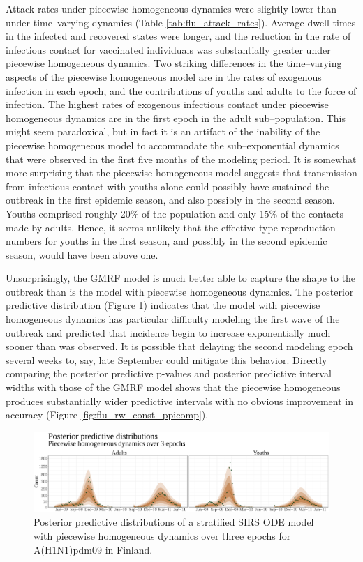 Attack rates under piecewise homogeneous dynamics were slightly lower than under time--varying dynamics (Table \ref{tab:flu_attack_rates}). Average dwell times in the infected and recovered states were longer, and the reduction in the rate of infectious contact for vaccinated individuals was substantially greater under piecewise homogeneous dynamics. Two striking differences in the time--varying aspects of the piecewise homogeneous model are in the rates of exogenous infection in each epoch, and the contributions of youths and adults to the force of infection. The highest rates of exogenous infectious contact under piecewise homogeneous dynamics are in the first epoch in the adult sub--population. This might seem paradoxical, but in fact it is an artifact of the inability of the piecewise homogeneous model to accommodate the sub--exponential dynamics that were observed in the first five months of the modeling period. It is somewhat more surprising that the piecewise homogeneous model suggests that transmission from infectious contact with youths alone could possibly have sustained the outbreak in the first epidemic season, and also possibly in the second season. Youths comprised roughly 20\% of the population and only 15\% of the contacts made by adults. Hence, it seems unlikely that the effective type reproduction numbers for youths in the first season, and possibly in the second epidemic season, would have been above one. 

Unsurprisingly, the GMRF model is much better able to capture the shape to the outbreak than is the model with piecewise homogeneous dynamics. The posterior predictive distribution (Figure \ref{fig:flupostpredsconstode}) indicates that the model with piecewise homogeneous dynamics has particular difficulty modeling the first wave of the outbreak and predicted that incidence begin to increase exponentially much sooner than was observed. It is possible that delaying the second modeling epoch several weeks to, say, late September could mitigate this behavior. Directly comparing the posterior predictive p-values and posterior predictive interval widths with those of the GMRF model shows that the piecewise homogeneous produces substantially wider predictive intervals with no obvious improvement in accuracy (Figure \ref{fig:flu_rw_const_ppicomp}).

\begin{figure}[htbp]
	\centering
	\includegraphics[width=\linewidth]{figures/flu_postpreds_const_ode}
	\caption{Posterior predictive distributions of a stratified SIRS ODE model with piecewise homogeneous dynamics over three epochs for A(H1N1)pdm09 in Finland.}
	\label{fig:flupostpredsconstode}
\end{figure}

